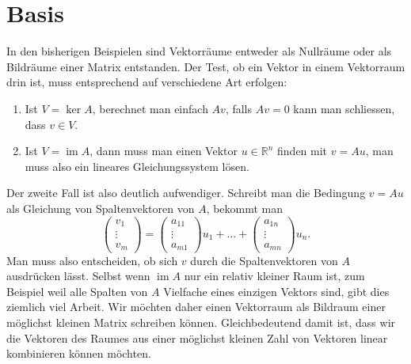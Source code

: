 %
%
%
\section{Basis}
In den bisherigen Beispielen sind Vektorräume entweder als Nullräume oder
als Bildräume einer Matrix entstanden.
Der Test, ob ein Vektor in einem
Vektorraum drin ist, muss entsprechend auf verschiedene Art erfolgen:
\begin{enumerate}
\item Ist $V=\operatorname{ker}A$, berechnet man einfach $Av$, falls $Av=0$
kann man schliessen, dass $v\in V$.
\item Ist $V=\operatorname{im}A$, dann muss man einen Vektor $u\in\mathbb R^n$
finden mit $v=Au$, man muss also ein lineares Gleichungssystem lösen.
\end{enumerate}
Der zweite Fall ist also deutlich aufwendiger.
Schreibt man die Bedingung
$v=Au$ als Gleichung von Spaltenvektoren von $A$, bekommt man
\[
\begin{pmatrix}v_1\\\vdots\\v_m\end{pmatrix}
=
\begin{pmatrix}a_{11}\\\vdots\\a_{m1}\end{pmatrix}u_1+\dots+
\begin{pmatrix}a_{1n}\\\vdots\\a_{mn}\end{pmatrix}u_n.
\]
Man muss also entscheiden, ob sich $v$ durch die Spaltenvektoren von
$A$ ausdrücken lässt.
Selbst wenn $\operatorname{im}A$ nur ein
relativ kleiner Raum ist, zum Beispiel weil alle Spalten von $A$
Vielfache eines
einzigen Vektors sind, gibt dies ziemlich viel Arbeit.
Wir möchten
daher einen Vektorraum als Bildraum einer möglichst kleinen Matrix
schreiben können.
Gleichbedeutend damit ist, dass wir die Vektoren
des Raumes aus einer möglichst kleinen Zahl von Vektoren linear
kombinieren können möchten.

